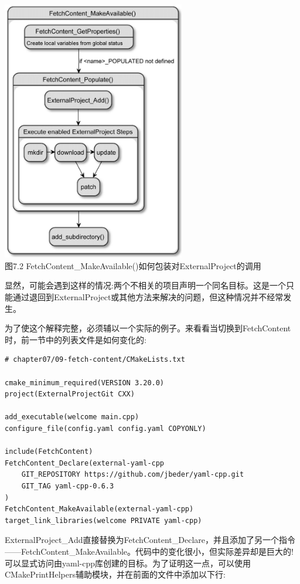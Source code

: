 \begin{center}
\includegraphics[width=0.6\textwidth]{content/2/chapter7/images/2.jpg}\\
图7.2  FetchContent\_MakeAvailable()如何包装对ExternalProject的调用
\end{center}

显然，可能会遇到这样的情况:两个不相关的项目声明一个同名目标。这是一个只能通过退回到ExternalProject或其他方法来解决的问题，但这种情况并不经常发生。

为了使这个解释完整，必须辅以一个实际的例子。来看看当切换到FetchContent时，前一节中的列表文件是如何变化的:

\begin{lstlisting}[style=styleCMake]
# chapter07/09-fetch-content/CMakeLists.txt

cmake_minimum_required(VERSION 3.20.0)
project(ExternalProjectGit CXX)

add_executable(welcome main.cpp)
configure_file(config.yaml config.yaml COPYONLY)

include(FetchContent)
FetchContent_Declare(external-yaml-cpp
	GIT_REPOSITORY https://github.com/jbeder/yaml-cpp.git
	GIT_TAG yaml-cpp-0.6.3
)
FetchContent_MakeAvailable(external-yaml-cpp)
target_link_libraries(welcome PRIVATE yaml-cpp)
\end{lstlisting} 

ExternalProject\_Add直接替换为FetchContent\_Declare，并且添加了另一个指令——FetchContent\_MakeAvailable。代码中的变化很小，但实际差异却是巨大的!可以显式访问由yaml-cpp库创建的目标。为了证明这一点，可以使用CMakePrintHelpers辅助模块，并在前面的文件中添加以下行:

